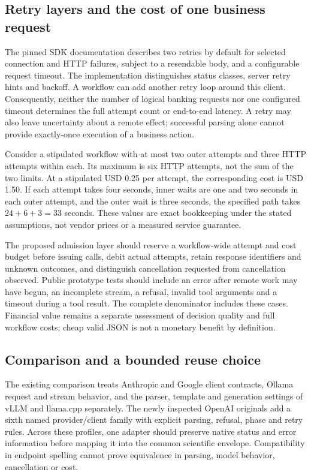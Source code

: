 \subsection{Retry layers and the cost of one business request}
The pinned SDK documentation describes two retries by default for selected connection and HTTP failures,
subject to a resendable body, and a configurable request timeout. The implementation distinguishes status
classes, server retry hints and backoff. A workflow can add another retry loop around this client. Consequently,
neither the number of logical banking requests nor one configured timeout determines the full attempt count or
end-to-end latency. A retry may also leave uncertainty about a remote effect; successful parsing alone cannot
provide exactly-once execution of a business action.~\citep{exec28_oa_sdk}

Consider a stipulated workflow with at most two outer attempts and three HTTP attempts within each. Its maximum
is six HTTP attempts, not the sum of the two limits. At a stipulated USD 0.25 per attempt, the corresponding
cost is USD 1.50. If each attempt takes four seconds, inner waits are one and two seconds in each outer attempt,
and the outer wait is three seconds, the specified path takes \(24+6+3=33\) seconds. These values are exact
bookkeeping under the stated assumptions, not vendor prices or a measured service guarantee.~\citep{exec28_oa_reference}

The proposed admission layer should reserve a workflow-wide attempt and cost budget before issuing calls,
debit actual attempts, retain response identifiers and unknown outcomes, and distinguish cancellation requested
from cancellation observed. Public prototype tests should include an error after remote work may have begun,
an incomplete stream, a refusal, invalid tool arguments and a timeout during a tool result. The complete
denominator includes these cases. Financial value remains a separate assessment of decision quality and full
workflow costs; cheap valid JSON is not a monetary benefit by definition.

\subsection{Comparison and a bounded reuse choice}
The existing comparison treats Anthropic and Google client contracts, Ollama request and stream behavior,
and the parser, template and generation settings of vLLM and llama.cpp separately. The newly inspected OpenAI
originals add a sixth named provider/client family with explicit parsing, refusal, phase and retry rules.
Across these profiles, one adapter should preserve native status and error information before mapping it into
the common scientific envelope. Compatibility in endpoint spelling cannot prove equivalence in parsing,
model behavior, cancellation or cost.~\citep{exec24_backend_anthropic,exec24_backend_google,exec24_backend_ollama,exec24_backend_vllm,exec24_backend_llamacpp,exec28_oa_sdk}

